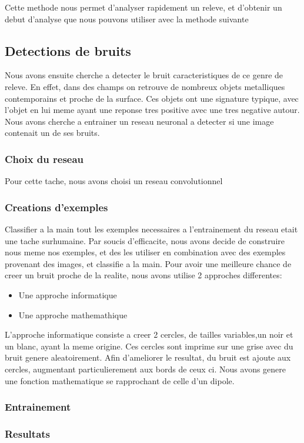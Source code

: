 \documentclass[a4paper, 12pt, titlepage, oneside]{article}
\begin{document}
	Cette methode nous permet d'analyser rapidement un releve, et d'obtenir un debut d'analyse que nous pouvons utiliser avec la methode suivante
	\subsection{Detections de bruits}
	Nous avons ensuite cherche a detecter le bruit caracteristiques de ce genre de releve. En effet, dans des champs on retrouve de nombreux objets metalliques contemporains
	et proche de la surface. Ces objets ont une signature typique, avec l'objet en lui meme ayant une reponse tres positive avec une  tres negative autour. 
	Nous avons cherche a entrainer un reseau neuronal a detecter si une image contenait un de ses bruits.
	\subsubsection{Choix du reseau}
	Pour cette tache, nous avons choisi un reseau convolutionnel
	\subsubsection{Creations d'exemples}
	Classifier a la main tout les exemples necessaires a l'entrainement du reseau etait une tache surhumaine. Par soucis d'efficacite, nous avons decide de construire nous meme
	nos exemples, et des les utiliser en combination avec des exemples provenant des images, et classifie a la main.
	Pour avoir une meilleure chance de creer un bruit proche de la realite, nous avons utilise 2 approches differentes:
	\begin{itemize}
		\item Une approche informatique
		\item Une approche mathemathique
	\end{itemize}
	L'approche informatique consiste a creer 2 cercles, de tailles variables,un noir et un blanc, ayant la meme origine. Ces cercles sont imprime sur une  grise
	avec du bruit genere aleatoirement. Afin d'ameliorer le resultat, du bruit est ajoute aux cercles, augmentant particulierement aux bords de ceux ci.
	Nous avons genere une fonction mathematique se rapprochant de celle d'un dipole. 
	\subsubsection{Entrainement}
	\subsubsection{Resultats}
\end{document}
